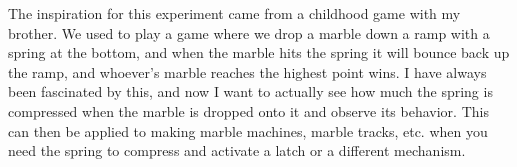 The inspiration for this experiment came from a childhood game with my brother. We used to play a game where we drop a marble down a ramp with a spring at the bottom, and when the marble hits the spring it will bounce back up the ramp, and whoever’s marble reaches the highest point wins. I have always been fascinated by this, and now I want to actually see how much the spring is compressed when the marble is dropped onto it and observe its behavior. This can then be applied to making marble machines, marble tracks, etc. when you need the spring to compress and activate a latch or a different mechanism.